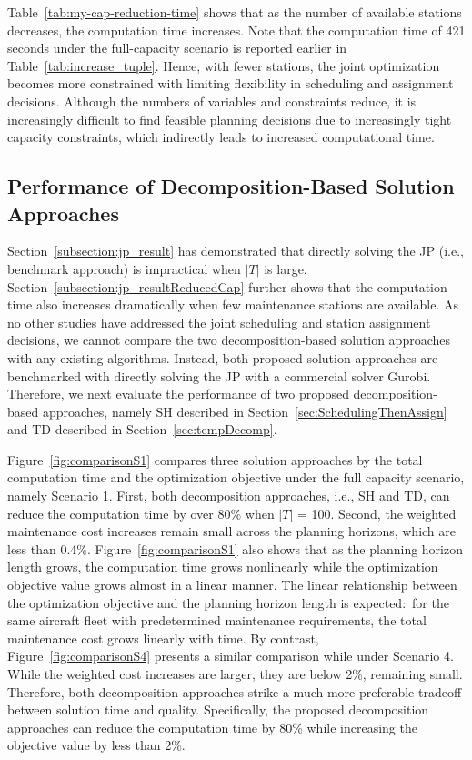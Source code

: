 Table~\ref{tab:my-cap-reduction-time} shows that as the number of available stations decreases, the computation time increases. Note that the computation time of 421 seconds under the full-capacity scenario is reported earlier in Table~\ref{tab:increase_tuple}. Hence, with fewer stations, the joint optimization becomes more constrained with limiting flexibility in scheduling and assignment decisions.  Although the numbers of variables and constraints reduce, it is increasingly difficult to find feasible planning decisions due to increasingly tight capacity constraints, which indirectly leads to increased computational time. 

\subsection{Performance of Decomposition-Based Solution Approaches}
\label{performance_decomp}


Section~\ref{subsection:jp_result} has demonstrated that directly solving the JP (i.e., benchmark approach) is impractical when $|T|$ is large. Section~\ref{subsection:jp_resultReducedCap} further shows that the computation time also increases dramatically when few maintenance stations are available. As no other studies have addressed the joint scheduling and station assignment decisions, we cannot compare the two decomposition-based solution approaches with any existing algorithms. Instead, both proposed solution approaches are benchmarked with directly solving the JP with a commercial solver Gurobi. \color{black} Therefore, we next evaluate the performance of two proposed decomposition-based approaches, namely SH described in Section~\ref{sec:SchedulingThenAssign} and TD described in Section~\ref{sec:tempDecomp}. 

Figure~\ref{fig:comparisonS1} compares three solution approaches by the total computation time and the optimization objective under the full capacity scenario, namely Scenario 1. First, both decomposition approaches, i.e., SH and TD, can reduce the computation time by over 80\% when $|T|$ = 100. Second, the weighted maintenance cost increases remain small across the planning horizons, which are less than 0.4\%. Figure~\ref{fig:comparisonS1} also shows that as the planning horizon length grows, the computation time grows nonlinearly while the optimization objective value grows almost in a linear manner. The linear relationship between the optimization objective and the planning horizon length is expected:~for the same aircraft fleet with predetermined maintenance requirements, the total maintenance cost grows linearly with time. \color{black} By contrast, Figure~\ref{fig:comparisonS4} presents a similar comparison while under Scenario 4. While the weighted cost increases are larger, they are below 2\%, remaining small. Therefore, both decomposition approaches strike a much more preferable tradeoff between solution time and quality. Specifically, the proposed decomposition approaches can reduce the computation time by 80\% while increasing the objective value by less than 2\%.

